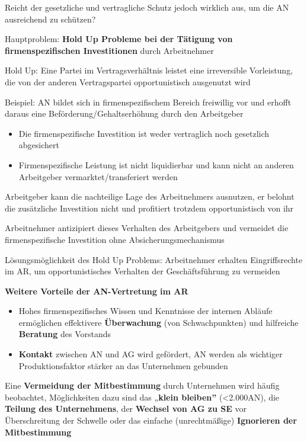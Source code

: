 \documentclass[
]{article}
\providecommand{\tightlist}{%
  \setlength{\itemsep}{0pt}\setlength{\parskip}{0pt}}
\begin{document}
Reicht der gesetzliche und vertragliche Schutz jedoch wirklich aus, um
die AN ausreichend zu schützen?

Hauptproblem: \textbf{Hold Up Probleme bei der Tätigung von
firmenspezifischen Investitionen} durch Arbeitnehmer

Hold Up: Eine Partei im Vertragsverhältnis leistet eine irreversible
Vorleistung, die von der anderen Vertragspartei opportunistisch
ausgenutzt wird

Beispiel: AN bildet sich in firmenspezifischem Bereich freiwillig vor
und erhofft daraus eine Beförderung/Gehaltserhöhung durch den
Arbeitgeber

\begin{itemize}
\tightlist
\item
  Die firmenspezifische Investition ist weder vertraglich noch
  gesetzlich abgesichert
\item
  Firmenspezifische Leistung ist nicht liquidierbar und kann nicht an
  anderen Arbeitgeber vermarktet/transferiert werden
\end{itemize}

Arbeitgeber kann die nachteilige Lage des Arbeitnehmers ausnutzen, er
belohnt die zusätzliche Investition nicht und profitiert trotzdem
opportunistisch von ihr

Arbeitnehmer antizipiert dieses Verhalten des Arbeitgebers und vermeidet
die firmenspezifische Investition ohne Absicherungsmechanismus

Lösungsmöglichkeit des Hold Up Problems: Arbeitnehmer erhalten
Eingriffsrechte im AR, um opportunistisches Verhalten der
Geschäftsführung zu vermeiden

\textbf{Weitere Vorteile der AN-Vertretung im AR}

\begin{itemize}
\tightlist
\item
  Hohes firmenspezifisches Wissen und Kenntnisse der internen Abläufe
  ermöglichen effektivere \textbf{Überwachung} (von Schwachpunkten) und
  hilfreiche \textbf{Beratung} des Vorstands
\item
  \textbf{Kontakt} zwischen AN und AG wird gefördert, AN werden als
  wichtiger Produktionsfaktor stärker an das Unternehmen gebunden
\end{itemize}

Eine \textbf{Vermeidung der Mitbestimmung} durch Unternehmen wird häufig
beobachtet, Möglichkeiten dazu sind das „\textbf{klein bleiben''}
(\textless2.000AN), die \textbf{Teilung des Unternehmens}, der
\textbf{Wechsel von AG zu SE} vor Überschreitung der Schwelle oder das
einfache (unrechtmäßige) \textbf{Ignorieren der Mitbestimmung}
\end{document}
